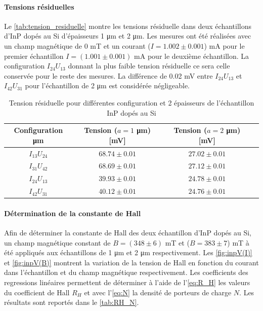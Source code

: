 \paragraph*{Tensions résiduelles}
Le \autoref{tab:tension_residuelle} montre les tensions résiduelle dans deux échantillons d'InP dopés au Si d'épaisseurs 1 \si{\micro\meter} et 2 \si{\micro\meter}. Les mesures ont été réalisées avec un champ magnétique de 0 \si{\milli\tesla} et un courant (\(I = 1.002 \pm 0.001\)) \si{\milli\ampere} pour le premier échantillon \(I = (1.001 \pm 0.001)\) \si{\milli\ampere} pour le deuxième échantillon. La configuration \(I_{24}U_{13}\) donnant la plus faible tension résiduelle ce sera celle conservée pour le reste des mesures. La différence de 0.02 \si{\milli \volt} entre \(I_{24}U_{13}\) et \(I_{42}U_{31}\) pour l'échantillon de 2 \si{\micro\meter} est considérée négligeable.

\begin{table}[h]
    \centering
    \begin{tabulary}{\textwidth}{C C C C}
        \toprule
        Configuration \si{\micro\meter} & Tension (\(a = 1\) \si{\micro\meter}) [\si{\milli\volt}] & Tension (\(a = 2\) \si{\micro\meter}) [\si{\milli\volt}] \\
        \midrule
        \(I_{13}U_{24}\) & \(68.74 \pm 0.01\) & \(27.02 \pm 0.01\) \\
        \(I_{31}U_{42}\) & \(68.69 \pm 0.01\) & \(27.12 \pm 0.01\) \\
        \(I_{24}U_{13}\) & \(39.93 \pm 0.01\) & \(24.78 \pm 0.01\) \\
        \(I_{42}U_{31}\) & \(40.12 \pm 0.01\) & \(24.76 \pm 0.01\) \\
        \bottomrule
    \end{tabulary}
    \caption{Tension résiduelle pour différentes configuration et 2 épaisseurs de l'échantillon InP dopés au Si}
    \label{tab:tension_residuelle}
\end{table}

\paragraph*{Détermination de la constante de Hall}
Afin de déterminer la constante de Hall des deux échantillon d'InP dopés au Si, un champ magnétique constant de \(B = (348 \pm 6)\) \si{\milli\tesla} et (\(B = 383 \pm 7\)) \si{\milli\tesla} à été appliqués aux échantillons de 1 \si{\micro\meter} et 2 \si{\micro\meter} respectivement. Les \autoref{fig:inpV(I)} et \autoref{fig:inpV(B)} montrent la variation de la tension de Hall en fonction du courant dans l'échantillon et du champ magnétique respectivement. Les coefficients des regressions linéaires permettent de déterminer à l'aide de l'\autoref{eq:R_H} les valeurs du coefficient de Hall \(R_H\) et avec l'\autoref{eq:N} la densité de porteurs de charge \(N\). Les résultats sont reportés dans le \autoref{tab:RH_N}.

